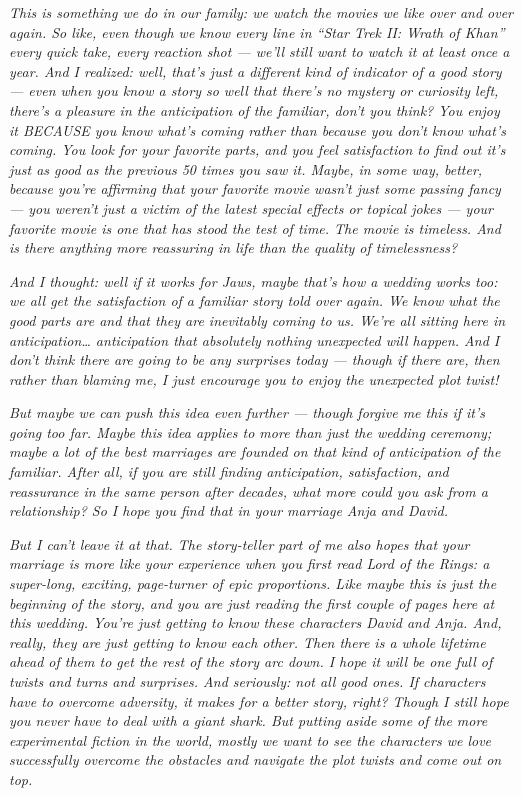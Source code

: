 \emph{This is something we do in our family: we watch the movies we like
over and over again. So like, even though we know every line in ``Star
Trek II: Wrath of Khan'' every quick take, every reaction shot --- we'll
still want to watch it at least once a year. And I realized: well,
that's just a different kind of indicator of a good story --- even when
you know a story so well that there's no mystery or curiosity left,
there's a pleasure in the anticipation of the familiar, don't you think?
You enjoy it BECAUSE you know what's coming rather than because you
don't know what's coming. You look for your favorite parts, and you feel
satisfaction to find out it's just as good as the previous 50 times you
saw it. Maybe, in some way, better, because you're affirming that your
favorite movie wasn't just some passing fancy --- you weren't just a
victim of the latest special effects or topical jokes --- your favorite
movie is one that has stood the test of time. The movie is timeless. And
is there anything more reassuring in life than the quality of
timelessness?}

\emph{And I thought: well if it works for Jaws, maybe that's how a
wedding works too: we all get the satisfaction of a familiar story told
over again. We know what the good parts are and that they are inevitably
coming to us. We're all sitting here in anticipation\ldots{}
anticipation that absolutely nothing unexpected will happen. And I don't
think there are going to be any surprises today --- though if there are,
then rather than blaming me, I just encourage you to enjoy the
unexpected plot twist!}

\emph{But maybe we can push this idea even further --- though forgive me
this if it's going too far. Maybe this idea applies to more than just
the wedding ceremony; maybe a lot of the best marriages are founded on
that kind of anticipation of the familiar. After all, if you are still
finding anticipation, satisfaction, and reassurance in the same person
after decades, what more could you ask from a relationship? So I hope
you find that in your marriage Anja and David.}

\emph{But I can't leave it at that. The story-teller part of me also
hopes that your marriage is more like your experience when you first
read Lord of the Rings: a super-long, exciting, page-turner of epic
proportions. Like maybe this is just the beginning of the story, and you
are just reading the first couple of pages here at this wedding. You're
just getting to know these characters David and Anja. And, really, they
are just getting to know each other. Then there is a whole lifetime
ahead of them to get the rest of the story arc down. I hope it will be
one full of twists and turns and surprises. And seriously: not all good
ones. If characters have to overcome adversity, it makes for a better
story, right? Though I still hope you never have to deal with a giant
shark. But putting aside some of the more experimental fiction in the
world, mostly we want to see the characters we love successfully
overcome the obstacles and navigate the plot twists and come out on
top.}

